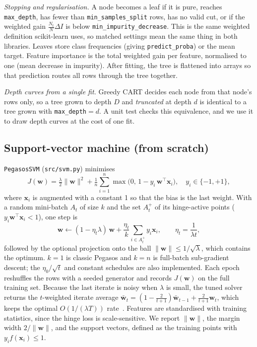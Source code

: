 \documentclass[10pt,twocolumn,a4paper]{article}
\newcommand{\vect}[1]{\mathbf{#1}}
\begin{document}
\emph{Stopping and regularisation.} A node becomes a leaf if it is pure,
reaches \texttt{max\_depth}, has fewer than \texttt{min\_samples\_split}
rows, has no valid cut, or if the weighted gain
$\frac{N_t}{N}\Delta I$ is below \texttt{min\_impurity\_decrease}. This is
the same weighted definition scikit-learn uses, so matched settings mean
the same thing in both libraries. Leaves store class frequencies (giving
\texttt{predict\_proba}) or the mean target. Feature importance is the
total weighted gain per feature, normalised to one (mean decrease in
impurity). After fitting, the tree is flattened into arrays so that
prediction routes all rows through the tree together.

\emph{Depth curves from a single fit.} Greedy CART decides each node from
that node's rows only, so a tree grown to depth $D$ and \emph{truncated}
at depth $d$ is identical to a tree grown with \texttt{max\_depth}$=d$. A
unit test checks this equivalence, and we use it to draw depth curves at
the cost of one fit.

\subsection{Support-vector machine (from scratch)}
\texttt{PegasosSVM} (\texttt{src/svm.py}) minimises
\begin{equation}
  J(\vect{w})=\tfrac{\lambda}{2}\lVert\vect{w}\rVert^{2}
  +\tfrac{1}{n}\sum_{i=1}^{n}\max\!\big(0,\,1-y_i\,\vect{w}^{\top}\vect{x}_i\big),
  \quad y_i\in\{-1,+1\},
\end{equation}
where $\vect{x}_i$ is augmented with a constant 1 so that the bias is the
last weight. With a random mini-batch $A_t$ of size $k$ and the set
$A_t^{+}$ of its hinge-active points ($y_i\vect{w}^{\top}\vect{x}_i<1$),
one step is
\begin{equation}
  \vect{w}\leftarrow(1-\eta_t\lambda)\,\vect{w}+\frac{\eta_t}{k}\sum_{i\in A_t^{+}}y_i\vect{x}_i,
  \qquad \eta_t=\frac{1}{\lambda t},
\end{equation}
followed by the optional projection onto the ball
$\lVert\vect{w}\rVert\le1/\sqrt\lambda$, which contains the optimum.
$k=1$ is classic Pegasos and $k=n$ is full-batch sub-gradient descent;
the $\eta_0/\sqrt t$ and constant schedules are also implemented. Each
epoch reshuffles the rows with a seeded generator and records
$J(\vect{w})$ on the full training set. Because the last iterate is noisy
when $\lambda$ is small, the tuned solver returns the $t$-weighted iterate
average
$\bar{\vect w}_t=(1-\frac{2}{t+1})\bar{\vect w}_{t-1}+\frac{2}{t+1}\vect w_t$,
which keeps the optimal $O(1/(\lambda T))$ rate~\cite{lacoste}. Features
are standardised with training statistics, since the hinge loss is
scale-sensitive. We report $\lVert\vect w\rVert$, the margin width
$2/\lVert\vect w\rVert$, and the support vectors, defined as the training
points with $y_i f(\vect{x}_i)\le 1$.
\end{document}
